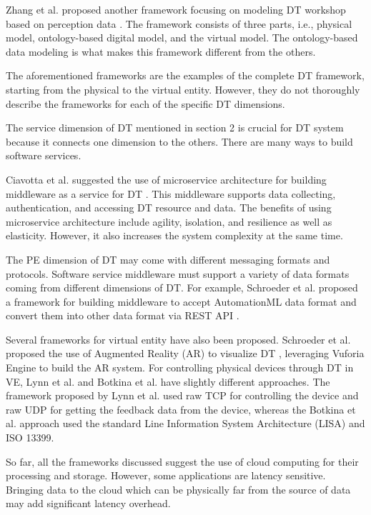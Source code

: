 \documentclass[article,table]{aaltoseries}
\begin{document}
Zhang et al. proposed another framework focusing on modeling DT workshop based on perception data \cite{Zhang2017}. The framework consists of three parts, i.e., physical model, ontology-based digital model, and the virtual model. The ontology-based data modeling is what makes this framework different from the others.

The aforementioned frameworks are the examples of the complete DT framework, starting from the physical to the virtual entity. However, they do not thoroughly describe the frameworks for each of the specific DT dimensions.

The service dimension of DT mentioned in section 2 is crucial for DT system because it connects one dimension to the others. There are many ways to build software services.

Ciavotta et al. suggested the use of microservice architecture for building middleware as a service for DT \cite{ciavotta2017microservice}. This middleware supports data collecting, authentication, and accessing DT resource and data. The benefits of using microservice architecture include agility, isolation, and resilience as well as elasticity. However, it also increases the system complexity at the same time.

The PE dimension of DT may come with different messaging formats and protocols. Software service middleware must support a variety of data formats coming from different dimensions of DT. For example, Schroeder et al. proposed a framework for building middleware to accept AutomationML data format and convert them into other data format via REST API \cite{Schroeder2016automationml}.

Several frameworks for virtual entity have also been proposed. Schroeder et al. proposed the use of Augmented Reality (AR) to visualize DT \cite{schroeder2016visualising}, leveraging Vuforia Engine to build the AR system. For controlling physical devices through DT in VE, Lynn et al. \cite{lynn2018realization} and Botkina et al. \cite{botkina2018digital} have slightly different approaches. The framework proposed by Lynn et al. used raw TCP for controlling the device and raw UDP for getting the feedback data from the device, whereas the Botkina et al. approach used the standard Line Information System Architecture (LISA) and ISO 13399.

So far, all the frameworks discussed suggest the use of cloud computing for their processing and storage. However, some applications are latency sensitive. Bringing data to the cloud which can be physically far from the source of data may add significant latency overhead.
\end{document}
